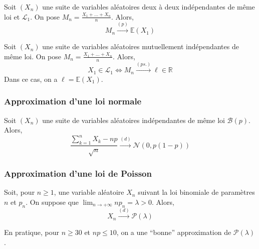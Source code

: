 
  \begin{theorem}
    Soit $(X_n)$ une suite de variables aléatoires deux à deux indépendantes de même loi et $\mathcal{L}_1$. On pose $M_n = \frac{X_1 + \dots + X_n}{n}$. Alors,
    \[ M_n \overset{(p)}{\longrightarrow} \mathbb{E}(X_1) \]
  \end{theorem}


  \begin{theorem}
    Soit $(X_n)$ une suite de variables aléatoires mutuellement indépendantes de même loi. On pose $M_n = \frac{X_1 + \dots + X_n}{n}$. Alors,
    \[ X_1 \in \mathcal{L}_1 \iff M_n \overset{(ps.)}{\longrightarrow} \ell \in \mathbb{R} \]
    Dans ce cas, on a $\ell = \mathbb{E}(X_1)$.
  \end{theorem}

  \subsubsection{Approximation d'une loi normale}


  \begin{theorem}
    Soit $(X_n)$ une suite de variables aléatoires indépendantes de même loi $\mathcal{B}(p)$. Alors,
    \[ \frac{\sum_{k=1}^{n} X_k - np}{\sqrt{n}} \overset{(d)}{\longrightarrow} \mathcal{N}(0, p(1-p)) \]
  \end{theorem}

  \subsubsection{Approximation d'une loi de Poisson}


  \begin{theorem}
    Soit, pour $n \geq 1$, une variable aléatoire $X_n$ suivant la loi binomiale de paramètres $n$ et $p_n$. On suppose que $\lim_{n \rightarrow +\infty} n p_n = \lambda > 0$.
    Alors,
    \[ X_n \overset{(d)}{\longrightarrow} \mathcal{P}(\lambda) \]
  \end{theorem}

  \begin{remark}
    En pratique, pour $n \geq 30$ et $np \leq 10$, on a une ``bonne'' approximation de $\mathcal{P}(\lambda)$.
  \end{remark}


